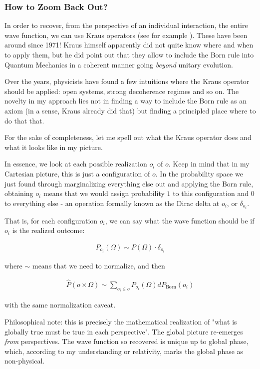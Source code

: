 \documentclass{article}
\begin{document}
\subsubsection{How to Zoom Back Out?}

In order to recover, from the perspective of an individual interaction, the entire wave function, we can use Kraus operators (see for example \cite{griffiths_qitd412}). These have been around since 1971! Kraus himself apparently did not quite know where and when to apply them, but he did point out that they allow to include the Born rule into Quantum Mechanics in a coherent manner going \textit{beyond} unitary evolution.

Over the years, physicists have found a few intuitions where the Kraus operator should be applied: open systems, strong decoherence regimes and so on. The novelty in my approach lies not in finding a way to include the Born rule as an axiom (in a sense, Kraus already did that) but finding a principled place where to do that that.

For the sake of completeness, let me spell out what the Kraus operator does and what it looks like in my picture.

In essence, we look at each possible realization $o_i$ of $o$. Keep in mind that in my Cartesian picture, this is just a configuration of $o$. In the probability space we just found through marginalizing everything else out and applying the Born rule, obtaining $o_i$ means that we would assign probability $1$ to this configuration and $0$ to everything else - an operation formally known as the Dirac delta at $o_i$, or $\delta_{o_i}$.

That is, for each configuration $o_i$, we can say what the wave function should be if $o_i$ is the realized outcome:

\begin{align*}
P_{o_i}(\Omega) \sim P(\Omega)\cdot \delta_{o_i}
\end{align*}

where $\sim$ means that we need to normalize, and then

\begin{align*}
\widehat{P}(o \times \Omega) \sim \sum_{o_i\in o} P_{o_i}(\Omega) dP_{\text{Born}}(o_i)
\end{align*}

with the same normalization caveat.

Philosophical note: this is precisely the mathematical realization of "what is globally true must be true in each perspective". The global picture re-emerges \textit{from} perspectives. The wave function so recovered is unique up to global phase, which, according to my understanding or relativity, marks the global phase as non-physical.
\end{document}
